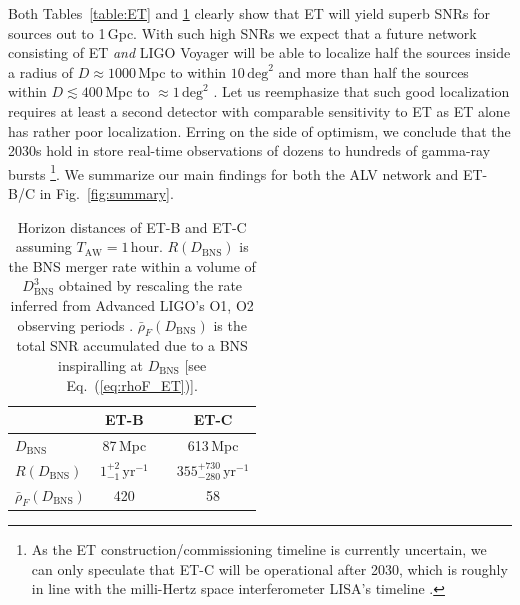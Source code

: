 \documentclass[prd,amsmath,amssymb,aps,floats,amsfonts,notitlepage,superscriptaddress,eqsecnum,nofootinbib,10pt]{revtex4-1}
\newcommand\T{\rule{0pt}{2.6ex}}       %
\newcommand\B{\rule[-1.2ex]{0pt}{0pt}} %
\begin{document}
Both Tables~\ref{table:ET} and \ref{table:horizon} clearly show that ET will yield superb SNRs for sources out to 1\,Gpc. 
With such high SNRs we expect that a future network consisting of ET \emph{and} LIGO Voyager will be able to localize half the sources 
inside a radius of $D\approx 1000\,$Mpc to within $ 10\,\text{deg}^2$ and more than half the sources within $D\lesssim 400\,$Mpc to $\approx 1\,\text{deg}^2$ \cite{Mills:2017urp}.
Let us reemphasize that such good localization requires at least a second detector with comparable sensitivity to ET as ET alone has rather poor localization.
Erring on the side of optimism, we conclude that the 2030s hold in store real-time observations of dozens to hundreds of gamma-ray bursts
\footnote{As the ET construction/commissioning timeline is currently uncertain, we can only speculate that ET-C will be operational after 2030,
which is roughly in line with the milli-Hertz space interferometer LISA's timeline \cite{Audley:2017drz}.}.
%
We summarize our main findings for both the ALV network and ET-B/C in Fig.~\ref{fig:summary}.
%
%
%
\begin{table}[h]
\centering
\begin{tabular}{lccc}
\hline\hline
 & ET-B & & ET-C\T\B\\
\hline
  $D_\text{BNS} $& 87\,Mpc& &{613\,Mpc}\T\\
  $R(D_\text{BNS}) $& $1^{+2}_{-1}\,\text{yr}^{-1}$&\hspace{5mm} &{$355^{+730}_{-280}\,\text{yr}^{-1}$}\T\\
  $\bar\rho_F(D_\text{BNS})$ & 420 &&{58}\T\B\\
\hline\hline
\end{tabular}
\caption{Horizon distances of ET-B and ET-C assuming $T_\text{AW} =1\,$hour. $R(D_\text{BNS})$ is the BNS merger rate within a volume of $D_\text{BNS}^3$
obtained by rescaling the rate inferred from Advanced LIGO's O1, O2 observing periods \cite{GW170817}. $\bar\rho_F(D_\text{BNS})$ is the total SNR accumulated due to a BNS inspiralling at $D_\text{BNS}$ [see Eq.~(\ref{eq:rhoF_ET})].}\label{table:horizon}
\end{table}
%
%
%
\end{document}
